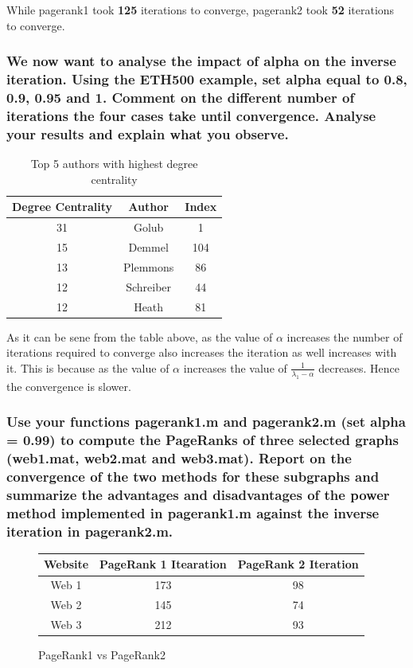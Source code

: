 \documentclass[unicode,11pt,a4paper,oneside,numbers=endperiod,openany]{scrartcl}
\begin{document}
While pagerank1 took \textbf{125} iterations to converge, pagerank2 took \textbf{52} iterations to converge.\\

\subsubsection{We now want to analyse the impact of alpha on the inverse iteration. Using the ETH500 example, set alpha equal to 0.8, 0.9, 0.95 and 1. Comment on the different number of iterations the four cases take until convergence. Analyse your results and explain what you observe.}




\noindent
\begin{table}[H]
    \centering
    \begin{tabular}{|c|c|c|}
        \hline
        Degree Centrality & Author    & Index \\
        \hline
        31                & Golub     & 1     \\
        \hline
        15                & Demmel    & 104   \\
        \hline
        13                & Plemmons  & 86    \\
        \hline
        12                & Schreiber & 44    \\
        \hline
        12                & Heath     & 81    \\
        \hline
    \end{tabular}
    \caption{Top 5 authors with highest degree centrality}
\end{table}

As it can be sene from the table above, as the value of $\alpha$ increases the number of iterations required to converge also increases the iteration as well increases with it. This is because as the value of $\alpha$ increases the value of $ \frac{1}{\lambda_1 - \alpha} $ decreases. Hence the convergence is slower. \\

\subsubsection{Use your functions pagerank1.m and pagerank2.m (set alpha = 0.99) to compute the PageRanks of three selected graphs (web1.mat, web2.mat and web3.mat). Report on the convergence of the two methods
for these subgraphs and summarize the advantages and disadvantages of the power method implemented in
pagerank1.m against the inverse iteration in pagerank2.m.}
\begin{figure}[H]
    \centering
    \begin{tabular}{|c|c|c|}
        \hline
        Website & PageRank 1 Itearation & PageRank 2 Iteration \\
        \hline
        Web 1 & 173 & 98 \\
        Web 2 & 145 & 74 \\
        Web 3 & 212 & 93 \\
        \hline
    \end{tabular}
    \caption{PageRank1 vs PageRank2}
\end{figure}
\end{document}
